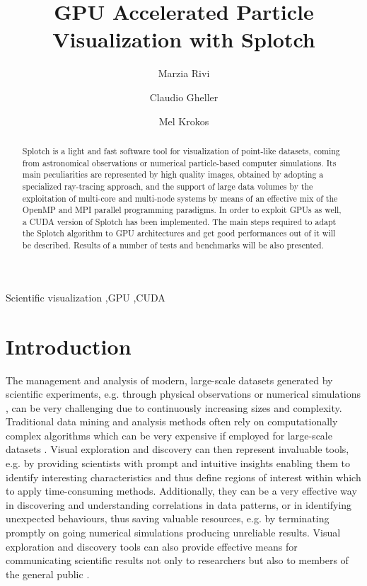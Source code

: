 \documentclass[1p]{elsarticle}
\begin{document}
\begin{frontmatter}

\title{GPU Accelerated Particle Visualization with Splotch}
\author[1]{Marzia Rivi} 
\address[1]{Department of Physics, University of Oxford, Keble Road, OX1 3RH Oxford, United Kingdom}
\author[2]{Claudio Gheller}
\address[2]{ETH-CSCS, via Trevano 131, 6900 Lugano, Switzerland}
\author[3]{Mel Krokos}
\address[3]{...  University of Portsmouth, ...}

\begin{abstract}
Splotch is a light and fast software tool for visualization of point-like datasets, coming from astronomical observations or numerical particle-based computer simulations. Its main peculiarities are represented by high quality images, obtained by adopting a specialized ray-tracing approach, and the support of large data volumes by the exploitation of multi-core and multi-node systems by means of an effective mix of the OpenMP and MPI parallel programming paradigms. In order to exploit GPUs as well, a CUDA version of Splotch has been implemented. The main steps required to adapt the Splotch algorithm to GPU architectures and get good performances out of it will be described. Results of a number of tests and benchmarks will be also presented. 
\end{abstract}

\begin{keyword}
Scientific visualization \sep GPU \sep CUDA
\end{keyword}

\end{frontmatter}

\section{Introduction}
\label{sec:intro}

 The management and analysis of modern, large-scale datasets generated by scientific experiments, e.g. through physical observations \cite{} or numerical simulations \cite{}, can be very challenging due to continuously increasing sizes and complexity. Traditional data mining and analysis methods often rely on computationally complex
algorithms \cite{} which can be very expensive if employed for 
large-scale datasets \cite{}. Visual exploration and discovery can then represent invaluable tools, e.g. by providing scientists with prompt and intuitive insights enabling them to identify interesting characteristics and thus define regions of interest within which
to apply time-consuming methods. Additionally, they can be a very effective way in discovering and understanding correlations in data patterns, or in identifying unexpected behaviours, thus saving valuable resources, e.g. by terminating promptly on going numerical simulations producing unreliable results. Visual exploration and discovery tools can also provide effective means for communicating scientific results not only to researchers \cite{} but also to members of the general public \cite{}.
\end{document}

